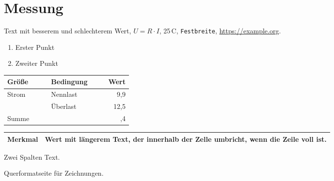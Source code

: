 \documentclass[a4paper,11pt]{article}
\begin{document}
\section{Messung}
Text mit \textcolor{besser}{besserem} und \textcolor{schlechter}{schlechterem} Wert,
$U = R \cdot I$, 25\,\textdegree C, \texttt{Festbreite}, \url{https://example.org}.

\begin{enumerate}[label=\arabic*., leftmargin=*]
\item Erster Punkt
\item Zweiter Punkt
\end{enumerate}

\begin{tabular}{|l|>{\raggedright\arraybackslash}p{0.3\linewidth}|r|}
\hline
\rowcolor{gray!20} Größe & Bedingung & Wert \\
\hline
\multirow{2}{*}{Strom} & Nennlast & \cellcolor{besser!25} 9,9 \\
\cline{2-3}
 & Überlast & 12,5 \\
\hline
\multicolumn{2}{|l|}{Summe} & 22,4 \\
\hline
\end{tabular}

\begin{tabularx}{\linewidth}{|l|X|}
\hline
Merkmal & Wert mit längerem Text, der innerhalb der Zelle umbricht, wenn die Zeile voll ist. \\
\hline
\end{tabularx}

\begin{minipage}[t]{0.48\linewidth}
\end{minipage}\hfill
\begin{minipage}[t]{0.48\linewidth}
\begin{multicols}{2}
Zwei Spalten Text.
\end{multicols}
\end{minipage}

\begin{landscape}
Querformatseite für Zeichnungen.
\end{landscape}
\end{document}
